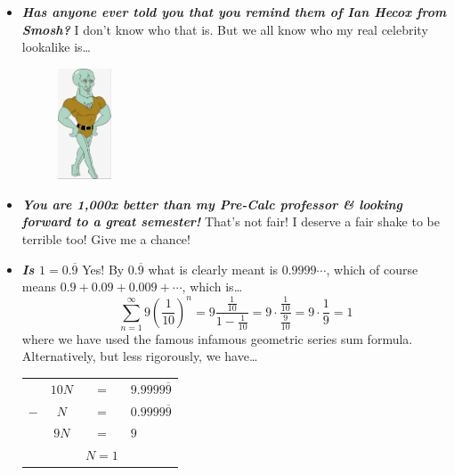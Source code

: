 \documentclass[11pt,letterpaper]{article}
\begin{document}
\begin{itemize}
\item {\bfseries\itshape Has anyone ever told you that you remind them of Ian Hecox from Smosh?} I don't know who that is. But we all know who my real celebrity lookalike is\dots
	\begin{figure}[H]
	\centering
	\includegraphics[width=0.15\textwidth]{images/handsomesquidward.jpg}
	\end{figure}

\item {\bfseries\itshape You are 1,000x better than my Pre-Calc professor \& looking forward to a great semester!} That's not fair! I deserve a fair shake to be terrible too! Give me a chance!

\item {\bfseries\itshape Is $1= 0.\overline{9}$} Yes! By $0.\overline{9}$ what is clearly meant is $0.9999\cdots$, which of course means $0.9 + 0.09 + 0.009 + \cdots$, which is\dots
	\[
	\sum_{n=1}^\infty 9 \left( \dfrac{1}{10} \right)^n= 9 \dfrac{\tfrac{1}{10}}{1 - \tfrac{1}{10}}= 9 \cdot \dfrac{\tfrac{1}{10}}{\tfrac{9}{10}}= 9 \cdot \dfrac{1}{9}= 1
	\]
where we have used the famous infamous geometric series sum formula. Alternatively, but less rigorously, we have\dots
	\begin{table}[!ht]
	\centering\small
	\begin{tabular}{lccc}
	& $10N$ & $=$ & $9.9999\overline{9}$ \\ 
	$-$ & $N$ & $=$ & $0.9999\overline{9}$ \\ \hline
	& $9N$ & $=$ & $9\phantom{.9999\overline{9}}$ \\
	& & $N= 1$ & 
	\end{tabular}
	\end{table}
\end{itemize}
\end{document}
